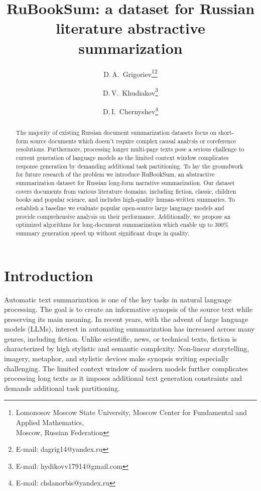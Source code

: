 \documentclass{superfri}
\begin{document}
\raggedbottom
\author{D.\,A.~Grigoriev\footnote{\label{msu}Lomonosov Moscow State University, Moscow Center for Fundamental and Applied Mathematics, \\ Moscow, Russian Federation}\footnote{E-mail: dagrig14@yandex.ru} \and D.\,V.~Khudiakov\footnote{E-mail: hydikovv17914@gmail.com} \and D.\,I.~Chernyshev\footnote{E-mail: chdanorbis@yandex.ru}}

\title{RuBookSum: a dataset for Russian literature abstractive summarization}

\maketitle{}

\begin{abstract}
The majority of existing Russian document summarization datasets focus on short-form source documents which doesn't require complex causal analysis or 
coreference resolutions. Furthermore, processing longer multi-page texts pose a serious challenge to current generation of language models as the 
limited context window complicates response generation by demanding additional task partitioning. 
To lay the groundwork for future research of the problem we introduce RuBookSum, an abstractive summarization dataset for Russian long-form narrative summarization. 
Our dataset covers documents from various literature domains, including fiction, classic, children books and popular science, and includes high-quality human-written 
summaries. To establish a baseline we evaluate popular open-source large language models and provide comprehensive analysis on their performance. Additionally, 
we propose an optimized algorithms for long-document summarization which enable up to 300\% summary generation speed up without significant drops in quality.

\end{abstract}




\section*{Introduction}
Automatic text summarization is one of the key tasks in natural language processing. The goal is to create an informative synopsis of the source text while preserving its main meaning.
In recent years, with the advent of large language models (LLMs), interest in automating summarization has increased across many genres, including fiction.
Unlike scientific, news, or technical texts, fiction is characterized by high stylistic and semantic complexity.
Non-linear storytelling, imagery, metaphor, and stylistic devices make synopsis writing especially challenging.
The limited context window of modern models further complicates processing long texts as it imposes additional text generation constraints and demands additional task partitioning.
\end{document}
